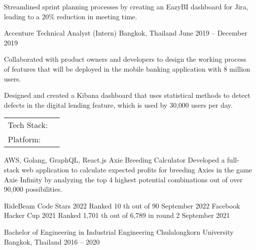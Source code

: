 \documentclass[]{awesome-cv}
\begin{document}
\begin{cventries}
{\begin{cvitems}
			\item {Streamlined sprint planning processes by creating an EazyBI dashboard for Jira,\\ leading to a 20\% reduction in meeting time.}
		\end{cvitems}}
	\cventry
	{Accenture}
	{Technical Analyst (Intern)}
	{Bangkok, Thailand}
	{June 2019 – December 2019}
	{\begin{cvitems}
			\item {Collaborated with product owners and developers to design the working process\\ of features that will be deployed in the mobile banking application with 8 million users.}
			\item {Designed and created a Kibana dashboard that uses statistical methods to detect\\ defects in the digital lending feature, which is used by 30,000 users per day.}
		\end{cvitems}}
\end{cventries}

\vspace{-4mm}
\begin{cventries}
	\cventry
	{}
	{\def\arraystretch{1.15}{\begin{tabular}{ p{2.5cm} l }
				Tech Stack: & {\skill{ Kotlin, Flutter, Golang, TypeScript, node.js, React.js, PostgreSQL, MongoDB}} \\
				Platform:   & {\skill{ AWS, GCP, OpenShift, Kubernetes, Docker, Control-M}}                          \\
			\end{tabular}}}
	{}
	{}
	{}
\end{cventries}

\vspace{-8mm}
\begin{cventries}
	\cventry
	{AWS, Golang, GraphQL, React.js}
	{Axie Breeding Calculator}
	{}
	{}
	{Developed a full-stack web application to calculate expected profits for breeding Axies in the game Axie Infinity by analyzing the top 4 highest potential combinations out of over 90,000 possibilities.}
\end{cventries}

\begin{cvhonors}
	\cvhonor
	{RideBeam Code Stars 2022}
	{Ranked 10 th out of 90}
	{September 2022}
	\cvhonor
	{Facebook Hacker Cup 2021}
	{Ranked 1,701 th out of 6,789 in round 2}
	{September 2021}
\end{cvhonors}

\begin{cventries}
	\cventry
	{Bachelor of Engineering in Industrial Engineering}
	{Chulalongkorn University}
	{Bangkok, Thailand}
	{2016 – 2020}
	{}
\end{cventries}

\vspace{-2mm}
\
\end{document}
